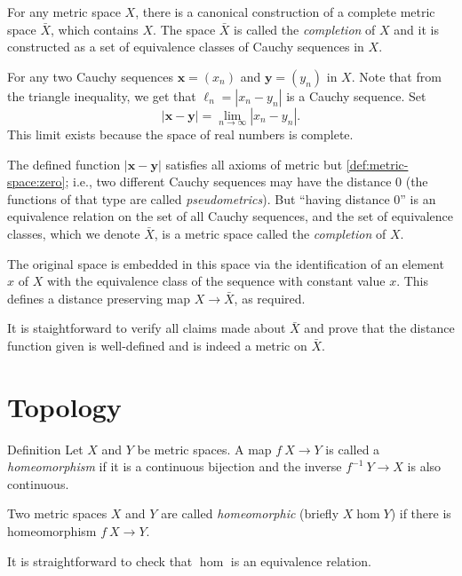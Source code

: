 For any metric space $X$, 
there is a canonical construction of a complete metric space $\bar X$, 
which contains $X$.
The space $\bar X$ is called the \emph{completion} of $X$ and it is constructed as 
a set of equivalence classes of Cauchy sequences in $X$. 

For any two Cauchy sequences $\bm{x}=(x_n)$ and $\bm{y}=(y_n)$ in $X$.
Note that from the triangle inequality, 
we get that $\ell_n=|x_n-y_n|$ is a Cauchy sequence.
Set
$$|\bm{x}-\bm{y}| = \lim_{n\to\infty} |x_n-y_n|.$$
This limit exists because 
the space of real numbers is complete. 

The defined function $|\bm{x}-\bm{y}|$ satisfies all axioms of metric but \ref{def:metric-space:zero};
i.e., two different Cauchy sequences may have the distance $0$ 
(the functions of that type are called \emph{pseudometrics}). 
But ``having distance 0'' is an equivalence relation on the set of all Cauchy sequences, and the set of equivalence classes, which we denote $\bar X$, is a metric space called the \emph{completion} of $X$.  

The original space is embedded in this space via the identification of an element $x$ of $X$ with the equivalence class of the sequence with constant value $x$.  
This defines a distance preserving map $X\to \bar X$, as required. 

It is staightforward to verify all claims made about $\bar X$ and prove that the distance function given is well-defined and is indeed a metric on $\bar X$.







\section{Topology}

\begin{thm}{Definition}
Let $X$ and $Y$ be metric spaces.
A map $f\:X\to Y$ is called a \emph{homeomorphism}
if it is a continuous bijection and the inverse $f^{-1}\:Y\to X$ is also continuous.

Two metric spaces $X$ and $Y$ are called \emph{homeomorphic} (briefly $X\hom Y$) if there is homeomorphism $f\:X\to Y$.
\end{thm}

It is straightforward to check that $\hom$ is an equivalence relation.

